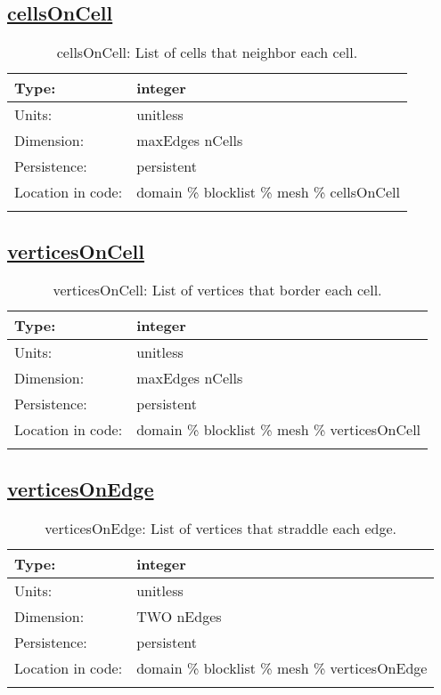 \subsection[cellsOnCell]{\hyperref[sec:var_tab_mesh]{cellsOnCell}}
\label{subsec:var_sec_mesh_cellsOnCell}
\begin{center}
\begin{longtable}{| p{2.0in} | p{4.0in} |}
        \hline 
        Type: & integer \\
        \hline 
        Units: & \si{unitless} \\
        \hline 
        Dimension: & maxEdges nCells \\
        \hline 
        Persistence: & persistent \\
        \hline 
         Location in code: & domain \% blocklist \% mesh \% cellsOnCell \\
         \hline 
    \caption{cellsOnCell: List of cells that neighbor each cell.}
\end{longtable}
\end{center}
\subsection[verticesOnCell]{\hyperref[sec:var_tab_mesh]{verticesOnCell}}
\label{subsec:var_sec_mesh_verticesOnCell}
\begin{center}
\begin{longtable}{| p{2.0in} | p{4.0in} |}
        \hline 
        Type: & integer \\
        \hline 
        Units: & \si{unitless} \\
        \hline 
        Dimension: & maxEdges nCells \\
        \hline 
        Persistence: & persistent \\
        \hline 
         Location in code: & domain \% blocklist \% mesh \% verticesOnCell \\
         \hline 
    \caption{verticesOnCell: List of vertices that border each cell.}
\end{longtable}
\end{center}
\subsection[verticesOnEdge]{\hyperref[sec:var_tab_mesh]{verticesOnEdge}}
\label{subsec:var_sec_mesh_verticesOnEdge}
\begin{center}
\begin{longtable}{| p{2.0in} | p{4.0in} |}
        \hline 
        Type: & integer \\
        \hline 
        Units: & \si{unitless} \\
        \hline 
        Dimension: & TWO nEdges \\
        \hline 
        Persistence: & persistent \\
        \hline 
         Location in code: & domain \% blocklist \% mesh \% verticesOnEdge \\
         \hline 
    \caption{verticesOnEdge: List of vertices that straddle each edge.}
\end{longtable}
\end{center}
